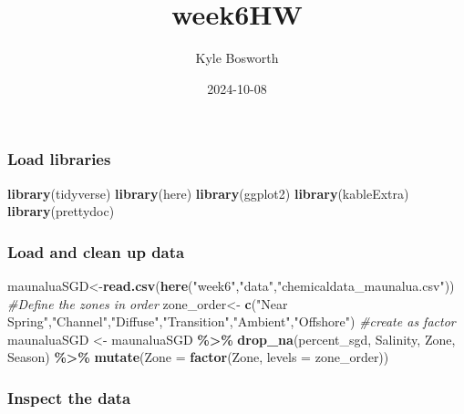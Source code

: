 \documentclass[
]{article}
\title{week6HW}
\author{Kyle Bosworth}
\date{2024-10-08}
\newenvironment{Shaded}{\begin{snugshade}}{\end{snugshade}}
\newcommand{\AttributeTok}[1]{\textcolor[rgb]{0.13,0.29,0.53}{#1}}
\newcommand{\CommentTok}[1]{\textcolor[rgb]{0.56,0.35,0.01}{\textit{#1}}}
\newcommand{\FunctionTok}[1]{\textcolor[rgb]{0.13,0.29,0.53}{\textbf{#1}}}
\newcommand{\NormalTok}[1]{#1}
\newcommand{\OtherTok}[1]{\textcolor[rgb]{0.56,0.35,0.01}{#1}}
\newcommand{\SpecialCharTok}[1]{\textcolor[rgb]{0.81,0.36,0.00}{\textbf{#1}}}
\newcommand{\StringTok}[1]{\textcolor[rgb]{0.31,0.60,0.02}{#1}}
\begin{document}
\maketitle

{
\setcounter{tocdepth}{2}
\tableofcontents
}
\subsubsection{Load libraries}\label{load-libraries}

\begin{Shaded}
\begin{Highlighting}[]
\FunctionTok{library}\NormalTok{(tidyverse)}
\FunctionTok{library}\NormalTok{(here)}
\FunctionTok{library}\NormalTok{(ggplot2)}
\FunctionTok{library}\NormalTok{(kableExtra)}
\FunctionTok{library}\NormalTok{(prettydoc)}
\end{Highlighting}
\end{Shaded}

\subsubsection{Load and clean up data}\label{load-and-clean-up-data}

\begin{Shaded}
\begin{Highlighting}[]
\NormalTok{maunaluaSGD}\OtherTok{\textless{}{-}}\FunctionTok{read.csv}\NormalTok{(}\FunctionTok{here}\NormalTok{(}\StringTok{"week6"}\NormalTok{,}\StringTok{"data"}\NormalTok{,}\StringTok{"chemicaldata\_maunalua.csv"}\NormalTok{))}
\CommentTok{\#Define the zones in order}
\NormalTok{zone\_order}\OtherTok{\textless{}{-}} \FunctionTok{c}\NormalTok{(}\StringTok{"Near Spring"}\NormalTok{,}\StringTok{"Channel"}\NormalTok{,}\StringTok{"Diffuse"}\NormalTok{,}\StringTok{"Transition"}\NormalTok{,}\StringTok{"Ambient"}\NormalTok{,}\StringTok{"Offshore"}\NormalTok{)}
\CommentTok{\#create as factor}
\NormalTok{maunaluaSGD }\OtherTok{\textless{}{-}}\NormalTok{ maunaluaSGD }\SpecialCharTok{\%\textgreater{}\%}
  \FunctionTok{drop\_na}\NormalTok{(percent\_sgd, Salinity, Zone, Season) }\SpecialCharTok{\%\textgreater{}\%}
  \FunctionTok{mutate}\NormalTok{(}\AttributeTok{Zone =} \FunctionTok{factor}\NormalTok{(Zone, }\AttributeTok{levels =}\NormalTok{ zone\_order))}
\end{Highlighting}
\end{Shaded}

\subsubsection{Inspect the data}\label{inspect-the-data}
\end{document}
